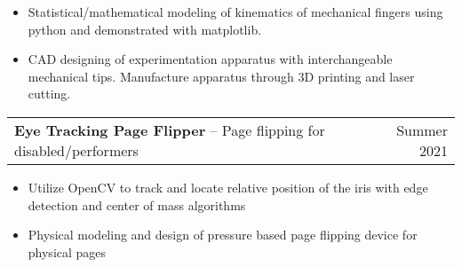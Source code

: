 \documentclass[oneside, 11pt]{article}
\newcommand*{\projectEntry}[3]{
	\noindent
	\begin{tabularx}{\textwidth}{Xr}
	\textbf{#1} -- #3 & #2
	\end{tabularx}
	\vspace{-1.25\baselineskip}
}
\newenvironment{expD}
	{\begin{itemize}[noitemsep,topsep=0pt]}
	{\end{itemize}}
\begin{document}
\begin{expD}
	\item Statistical/mathematical modeling of kinematics of mechanical fingers using python and demonstrated with matplotlib.
	\item CAD designing of experimentation apparatus with interchangeable mechanical tips. Manufacture apparatus through 3D printing and laser cutting.
\end{expD}

\projectEntry{Eye Tracking Page Flipper}
	{Summer 2021}
	{Page flipping for disabled/performers}

\begin{expD}
	\item Utilize OpenCV to track and locate relative position of the iris with edge detection and center of mass algorithms
	\item Physical modeling and design of pressure based page flipping device for physical pages
\end{expD}
\end{document}
